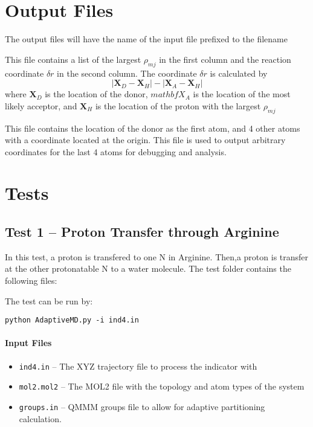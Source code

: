 \documentclass{article}
\begin{document}
\section{Output Files}
The output files will have the name of the input file prefixed to the filename
\begin{description}[style=unboxed, labelwidth=\linewidth, font =\sffamily\itshape\bfseries, listparindent =0pt, before =\sffamily]

\item[-indicator.log]
This file contains a list of the largest $\rho_{mj}$ in the first column and the reaction coordinate $\delta r$ in the second column.
The coordinate $\delta r$ is calculated by
\begin{equation}\label{eq:dr}
| \mathbf{X}_D - \mathbf{X}_H | - | \mathbf{X}_A - \mathbf{X}_H |
\end{equation}
where $\mathbf{X}_D$ is the location of the donor, $mathbf{X}_A$ is the location of the most likely acceptor, and $\mathbf{X}_H$ is the location of the proton with the largest $\rho_{mj}$

\item[-donor.xyz]
This file contains the location of the donor as the first atom, and 4 other atoms with a coordinate located at the origin.
This file is used to output arbitrary coordinates for the last 4 atoms for debugging and analysis.
\end{description}


\section{Tests}\label{sec:tests}

\subsection{Test 1 -- Proton Transfer through Arginine}
In this test, a proton is transfered to one N in Arginine.
Then,a proton is transfer at the other protonatable N to a water molecule.
The test folder contains the following files:

The test can be run by:

\texttt{python AdaptiveMD.py -i ind4.in}

\paragraph{Input Files}
\begin{itemize}
\item \texttt{ind4.in} -- The XYZ trajectory file to process the indicator with
\item \texttt{mol2.mol2} -- The MOL2 file with the topology and atom types of the system
\item \texttt{groups.in} -- \textsc{QMMM} groups file to allow for adaptive partitioning calculation.
\end{itemize}
\end{document}
